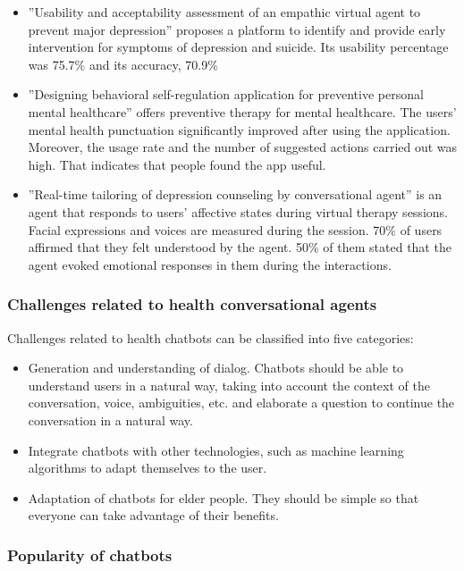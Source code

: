 \documentclass[12pt,english]{article}
\begin{document}
\begin{itemize}
  \item ''Usability and acceptability assessment of an empathic virtual agent to prevent major depression'' \cite{a9} proposes a platform to identify and provide early intervention for symptoms of depression and suicide. Its usability percentage was 75.7\% and its accuracy, 70.9\%
  \item ''Designing behavioral self-regulation application for preventive personal mental healthcare'' \cite{a3} offers preventive therapy for mental healthcare. The users' mental health punctuation significantly improved after using the application. Moreover, the usage rate and the number of suggested actions carried out was high. That indicates that people found the app useful.
  \item ''Real-time tailoring of depression counseling by conversational agent'' \cite{a4} is an agent that responds to users' affective states during virtual therapy sessions. Facial expressions and voices are measured during the session. 70\% of users affirmed that they felt understood by the agent. 50\% of them stated that the agent evoked emotional responses in them during the interactions.
\end{itemize}

\subsubsection{Challenges related to health conversational agents}

Challenges related to health chatbots can be classified into five categories:
\begin{itemize}
  \item Generation and understanding of dialog. Chatbots should be able to understand users in a natural way, taking into account the context of the conversation, voice, ambiguities, etc. and elaborate a question to continue the conversation in a natural way.
  \item Integrate chatbots with other technologies, such as machine learning algorithms to adapt themselves to the user.
  \item Adaptation of chatbots for elder people. They should be simple so that everyone can take advantage of their benefits.
\end{itemize}

\subsubsection{Popularity of chatbots}
\end{document}
